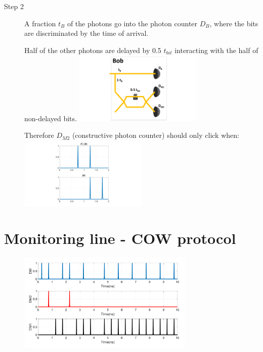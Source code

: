 \documentclass[1000pt]{article}
\newcommand{\mysection}[1]{\section*{\color{black}\sffamily #1}}%
\begin{document}
\begin{description}
  \item[Step 2] A fraction $t_B$ of the photons go into the photon counter $D_B$, where the bits are discriminated by the time of arrival.



\begin{multicols}{2}
Half of the other photons are delayed by 0.5 $t_{bit}$ interacting with the half of non-delayed bits.
    	\centering
    	\includegraphics[width=0.5\textwidth]{./figures/B.pdf}


\columnbreak
Therefore $D_{M2}$ (constructive photon counter) should only click when:
    	\centering
    	\includegraphics[width=0.5\textwidth]{./figures/S2.pdf}
    
\end{multicols}    


\end{description}  


\mysection{\Huge\textbf{Monitoring line - COW protocol}} \Large \vspace*{1cm}


  \begin{figure}[hbt]
    	\centering
    	\includegraphics[width=0.75\textwidth]{./figures/DM3.pdf}
    \end{figure}
\end{document}
